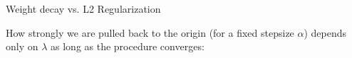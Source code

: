 \documentclass[11pt,compress,t,notes=noshow, xcolor=table]{beamer}
\begin{document}
\begin{vbframe}{Weight decay vs. L2 Regularization}
\framebreak

How strongly we are pulled back to the origin (for a fixed stepsize $\alpha$) depends only on $\lambda$ as long as the procedure converges:

\begin{figure}
  \\
\end{figure}


\end{vbframe}


\endlecture
\end{document}
